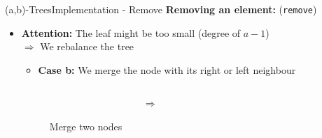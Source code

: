 \begin{frame}{(a,b)-Trees}{Implementation - Remove}
  \textbf{Removing an element:} (\texttt{\color{MainA}remove})
  \begin{itemize}
    \item<2->
      \textbf{Attention:} The leaf might be too small (degree of {\color{MainA}$a-1$})\\
      $\Rightarrow$ We {\color{MainA}rebalance} the tree
      \vspace{0.5em}
      \begin{itemize}
        \item<3->
          \textbf{Case b:}
          We {\color{MainA}merge} the node with its right or left
          neighbour
      \end{itemize}
      \begin{figure}
        \begin{columns}
          \begin{column}{0.45\linewidth}
            \begin{adjustbox}{width=\linewidth}
              
            \end{adjustbox}
          \end{column}
          \begin{column}{0.1\linewidth}
            \begin{center}
              $\Rightarrow$
            \end{center}
          \end{column}
          \begin{column}{0.45\linewidth}
            \begin{adjustbox}{width=0.85\linewidth}
              
            \end{adjustbox}
          \end{column}
        \end{columns}
        \caption{Merge two nodes}
        \label{fig:a_b_tree:merge}
      \end{figure}
  \end{itemize}
\end{frame}


